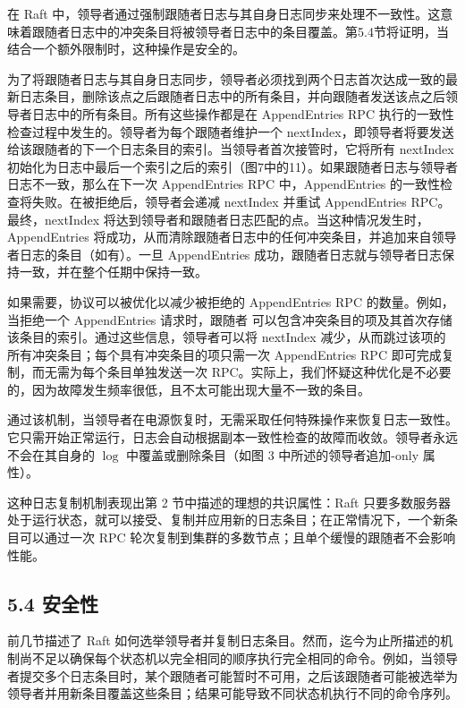 \documentclass[12pt,a4paper]{report} %
\begin{document}
在 Raft 中，领导者通过强制跟随者日志与其自身日志同步来处理不一致性。这意味着跟随者日志中的冲突条目将被领导者日志中的条目覆盖。第5.4节将证明，当结合一个额外限制时，这种操作是安全的。

为了将跟随者日志与其自身日志同步，领导者必须找到两个日志首次达成一致的最新日志条目，删除该点之后跟随者日志中的所有条目，并向跟随者发送该点之后领导者日志中的所有条目。所有这些操作都是在 AppendEntries RPC 执行的一致性检查过程中发生的。领导者为每个跟随者维护一个 nextIndex，即领导者将要发送给该跟随者的下一个日志条目的索引。当领导者首次接管时，它将所有 nextIndex 初始化为日志中最后一个索引之后的索引（图7中的11）。如果跟随者日志与领导者日志不一致，那么在下一次 AppendEntries RPC 中，AppendEntries 的一致性检查将失败。在被拒绝后，领导者会递减 nextIndex 并重试 AppendEntries RPC。最终，nextIndex 将达到领导者和跟随者日志匹配的点。当这种情况发生时，AppendEntries 将成功，从而清除跟随者日志中的任何冲突条目，并追加来自领导者日志的条目（如有）。一旦 AppendEntries 成功，跟随者日志就与领导者日志保持一致，并在整个任期中保持一致。

如果需要，协议可以被优化以减少被拒绝的 AppendEntries RPC 的数量。例如，当拒绝一个 AppendEntries 请求时，跟随者
可以包含冲突条目的项及其首次存储该条目的索引。通过这些信息，领导者可以将 nextIndex 减少，从而跳过该项的所有冲突条目；每个具有冲突条目的项只需一次 AppendEntries RPC 即可完成复制，而无需为每个条目单独发送一次 RPC。实际上，我们怀疑这种优化是不必要的，因为故障发生频率很低，且不太可能出现大量不一致的条目。

通过该机制，当领导者在电源恢复时，无需采取任何特殊操作来恢复日志一致性。它只需开始正常运行，日志会自动根据副本一致性检查的故障而收敛。领导者永远不会在其自身的 $\log$ 中覆盖或删除条目（如图 3 中所述的领导者追加-only 属性）。

这种日志复制机制表现出第 2 节中描述的理想的共识属性：Raft 只要多数服务器处于运行状态，就可以接受、复制并应用新的日志条目；在正常情况下，一个新条目可以通过一次 RPC 轮次复制到集群的多数节点；且单个缓慢的跟随者不会影响性能。

\subsection*{5.4 安全性}

前几节描述了 Raft 如何选举领导者并复制日志条目。然而，迄今为止所描述的机制尚不足以确保每个状态机以完全相同的顺序执行完全相同的命令。例如，当领导者提交多个日志条目时，某个跟随者可能暂时不可用，之后该跟随者可能被选举为领导者并用新条目覆盖这些条目；结果可能导致不同状态机执行不同的命令序列。
\end{document}
